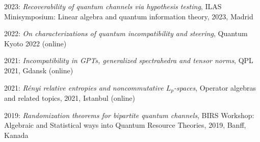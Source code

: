 \documentclass[12pt]{article}
\begin{document}
\begin{description}[noitemsep,leftmargin=1.3cm, font=\normalfont]
\item{2023:} \emph{Recoverability of quantum channels via hypothesis testing}, ILAS
Minisymposium: Linear algebra and quantum information theory,  2023, Madrid

\item{2022:} \emph{ On characterizations of quantum incompatibility and steering}, Quantum Kyoto 2022 (online)

\item{2021:} \emph{Incompatibility in GPTs, generalized spectrahedra and tensor norms},
QPL 2021, Gdansk (online)

\item{2021:} \emph{ Rényi relative entropies and noncommutative $L_p$-spaces}, Operator
algebras and related topics, 2021, Istanbul (online)

\item{2019:} \emph{Randomization theorems for bipartite quantum channels}, BIRS Workshop: Algebraic and Statistical ways into Quantum Resource Theories, 2019, Banff, Kanada


\end{description}
\end{document}
